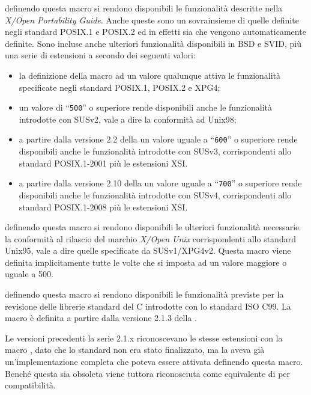 \begin{basedescript}{\desclabelwidth{2.7cm}\desclabelstyle{\nextlinelabel}}
\item[\macrod{\_XOPEN\_SOURCE}] definendo questa macro si rendono disponibili
  le funzionalità descritte nella \textit{X/Open Portability Guide}. Anche
  queste sono un sovrainsieme di quelle definite negli standard POSIX.1 e
  POSIX.2 ed in effetti sia  che
   vengono automaticamente definite. Sono incluse
  anche ulteriori funzionalità disponibili in BSD e SVID, più una serie di
  estensioni a secondo dei seguenti valori:
  \begin{itemize}
  \item la definizione della macro ad un valore qualunque attiva le
    funzionalità specificate negli standard POSIX.1, POSIX.2 e XPG4;
  \item un valore di ``\texttt{500}'' o superiore rende disponibili anche le
    funzionalità introdotte con SUSv2, vale a dire la conformità ad Unix98;
  \item a partire dalla versione 2.2 della  un valore uguale a
    ``\texttt{600}'' o superiore rende disponibili anche le funzionalità
    introdotte con SUSv3, corrispondenti allo standard POSIX.1-2001 più le
    estensioni XSI.
  \item a partire dalla versione 2.10 della  un valore uguale a
    ``\texttt{700}'' o superiore rende disponibili anche le funzionalità
    introdotte con SUSv4, corrispondenti allo standard POSIX.1-2008 più le
    estensioni XSI.
  \end{itemize}

\item[\macrod{\_XOPEN\_SOURCE\_EXTENDED}] definendo questa macro si rendono
  disponibili le ulteriori funzionalità necessarie la conformità al
  rilascio del marchio \textit{X/Open Unix} corrispondenti allo standard
  Unix95, vale a dire quelle specificate da SUSv1/XPG4v2. Questa macro viene
  definita implicitamente tutte le volte che si imposta
   ad un valore maggiore o uguale a 500.

\item[\macrod{\_ISOC99\_SOURCE}] definendo questa macro si rendono disponibili
  le funzionalità previste per la revisione delle librerie standard del C
  introdotte con lo standard ISO C99. La macro è definita a partire dalla
  versione 2.1.3 della . 

  Le versioni precedenti la serie 2.1.x riconoscevano le stesse estensioni con
  la macro , dato che lo standard non era stato
  finalizzato, ma la  aveva già un'implementazione completa che
  poteva essere attivata definendo questa macro. Benché questa sia obsoleta
  viene tuttora riconosciuta come equivalente di  per
  compatibilità.


\end{basedescript}
